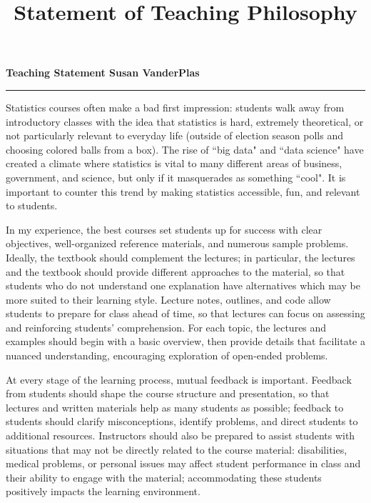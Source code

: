 \documentclass[10.25pt,letterpaper,sans,unicode]{moderncv}        %
\title{Statement of Teaching Philosophy}                               %
\begin{document}
\setlength{\parindent}{15pt} %
\noindent\textbf{\Large Teaching Statement \hfill Susan VanderPlas}\vspace{-3pt}\\\hrule\vspace{6pt}
Statistics courses often make a bad first impression: students walk away from introductory classes with the idea that statistics is hard, extremely theoretical, or not particularly relevant to everyday life (outside of election season polls and choosing colored balls from a box). The rise of ``big data" and ``data science" have created a climate where statistics is vital to many different areas of business, government, and science, but only if it masquerades as something ``cool". It is important to counter this trend by making statistics accessible, fun, and relevant to students. 

\vspace{.25cm}\hspace{8pt}
In my experience, the best courses set students up for success with clear objectives, well-organized reference materials, and numerous sample problems. Ideally, the textbook should complement the lectures; in particular, the lectures and the textbook should provide different approaches to the material, so that students who do not understand one explanation have alternatives which may be more suited to their learning style. Lecture notes, outlines, and code allow students to prepare for class ahead of time, so that lectures can focus on assessing and reinforcing students' comprehension. For each topic, the lectures and examples should begin with a basic overview, then provide details that facilitate a nuanced understanding, encouraging exploration of open-ended problems.  

\vspace{.25cm}\hspace{8pt}
At every stage of the learning process, mutual feedback is important. Feedback from students should shape the course structure and presentation, so that lectures and written materials help as many students as possible; feedback to students should clarify misconceptions, identify problems, and direct students to additional resources. Instructors should also be prepared to assist students with situations that may not be directly related to the course material: disabilities, medical problems, or personal issues may affect student performance in class and their ability to engage with the material; accommodating these students positively impacts the learning environment. 
\end{document}
